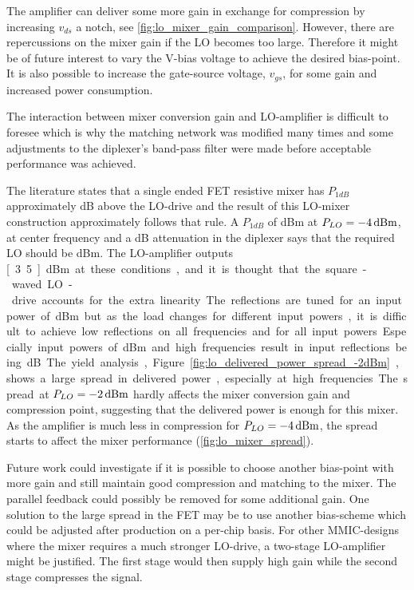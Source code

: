 		The amplifier can deliver some more gain in exchange for compression by increasing $v_{ds}$ a notch, see \autoref{fig:lo_mixer_gain_comparison}. However, there are repercussions on the mixer gain if the LO becomes too large. Therefore it might be of future interest to vary the \unit[5]{V}-bias voltage to achieve the desired bias-point. It is also possible to increase the gate-source voltage, $v_{gs}$, for some gain and increased power consumption.

		The interaction between mixer conversion gain and LO-amplifier is difficult to foresee which is why the matching network was modified many times and some adjustments to the diplexer's band-pass filter were made before acceptable performance was achieved.

		The literature states that a single ended FET resistive mixer has $P_{1dB}$ approximately \unit[4]{dB} above the LO-drive\autocite{radmanesh2002state} and the result of this LO-mixer construction approximately follows that rule. A $P_{1dB}$ of \unit[12]{dBm} at $P_{LO}=\unit[-4]{dBm}$, at center frequency and a \unit[3]{dB} attenuation in the diplexer says that the required LO should be \unit[5]{dBm}. The LO-amplifier outputs \unit[3.5]{dBm} at these conditions, and it is thought that the square-waved LO-drive accounts for the extra linearity.

		The reflections are tuned for an input power of \unit[-2]{dBm} but as the load changes for different input powers, it is difficult to achieve low reflections on all frequencies and for all input powers. Especially input powers of \unit[-4]{dBm} and high frequencies result in input reflections being \unit[-10]{dB}.

		The yield analysis, Figure \autoref{fig:lo_delivered_power_spread_-2dBm}, shows a large spread in delivered power, especially at high frequencies.  The spread at $P_{LO}=\unit[-2]{dBm}$ hardly affects the mixer conversion gain and compression point, suggesting that the delivered power is enough for this mixer. As the amplifier is much less in compression for $P_{LO}=\unit[-4]{dBm}$, the spread starts to affect the mixer performance (\autoref{fig:lo_mixer_spread}).

		Future work could investigate if it is possible to choose another bias-point with more gain and still maintain good compression and matching to the mixer. The parallel feedback could possibly be removed for some additional gain.  One solution to the large spread in the FET may be to use another bias-scheme which could be adjusted after production on a per-chip basis.
		For other MMIC-designs where the mixer requires a much stronger LO-drive, a two-stage LO-amplifier might be justified. The first stage would then supply high gain while the second stage compresses the signal.

